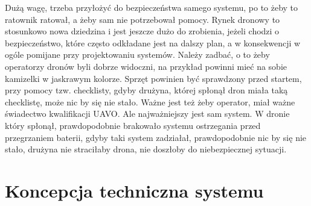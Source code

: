 Dużą wagę, trzeba przyłożyć do bezpieczeństwa samego systemu, po to żeby to ratownik ratował, a żeby sam nie potrzebował pomocy. Rynek dronowy to stosunkowo nowa dziedzina i jest jeszcze dużo do zrobienia, jeżeli chodzi o bezpieczeństwo, które często odkładane jest na dalszy plan, a w konsekwencji w ogóle pomijane przy projektowaniu systemów. Należy zadbać, o to żeby operatorzy dronów byli dobrze widoczni, na przykład powinni mieć na sobie kamizelki w jaskrawym kolorze. Sprzęt powinien być sprawdzony przed startem, przy pomocy tzw. checklisty, gdyby drużyna, której spłonął dron miała taką checklistę, może nic by się nie stało. Ważne jest też żeby operator, miał ważne świadectwo kwalifikacji UAVO. Ale najważniejszy jest sam system. W dronie który spłonął, prawdopodobnie brakowało systemu ostrzegania przed przegrzaniem baterii, gdyby taki system zadziałał, prawdopodobnie nic by się nie stało, drużyna nie straciłaby drona, nie doszłoby do niebezpiecznej sytuacji.

\section{Koncepcja techniczna systemu}

